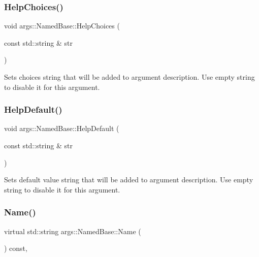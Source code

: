 \subsubsection{\texorpdfstring{Help\+Choices()}{HelpChoices()}}
{\footnotesize\ttfamily void args\+::\+Named\+Base\+::\+Help\+Choices (\begin{DoxyParamCaption}\item[{const std\+::string \&}]{str }\end{DoxyParamCaption})\hspace{0.3cm}{\ttfamily [inline]}}

Sets choices string that will be added to argument description. Use empty string to disable it for this argument. \mbox{\label{classargs_1_1_named_base_a1e94ca498932f60c6e98ba4b88abcc4b}} 
\subsubsection{\texorpdfstring{Help\+Default()}{HelpDefault()}}
{\footnotesize\ttfamily void args\+::\+Named\+Base\+::\+Help\+Default (\begin{DoxyParamCaption}\item[{const std\+::string \&}]{str }\end{DoxyParamCaption})\hspace{0.3cm}{\ttfamily [inline]}}

Sets default value string that will be added to argument description. Use empty string to disable it for this argument. \mbox{\label{classargs_1_1_named_base_a7e7bab5c0de59e717b87935b14376dfc}} 
\subsubsection{\texorpdfstring{Name()}{Name()}}
{\footnotesize\ttfamily virtual std\+::string args\+::\+Named\+Base\+::\+Name (\begin{DoxyParamCaption}{ }\end{DoxyParamCaption}) const\hspace{0.3cm}{\ttfamily [inline]}, {\ttfamily [virtual]}}



